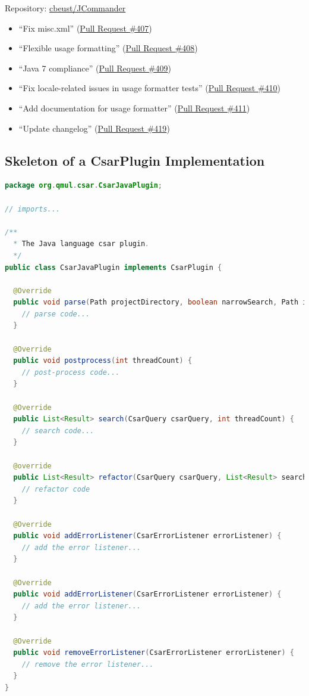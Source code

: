\documentclass[12pt, letterpaper]{article}
\begin{document}
Repository: \href{https://github.com/cbeust/jcommander}{cbeust/JCommander}
\begin{itemize}
  \item ``Fix misc.xml'' (\href{https://github.com/cbeust/jcommander/pull/407}{Pull Request \#407})
  \item ``Flexible usage formatting'' (\href{https://github.com/cbeust/jcommander/pull/408}{Pull Request \#408})
  \item ``Java 7 compliance'' (\href{https://github.com/cbeust/jcommander/pull/409}{Pull Request \#409})
  \item ``Fix locale-related issues in usage formatter tests'' (\href{https://github.com/cbeust/jcommander/pull/410}{Pull Request \#410})
  \item ``Add documentation for usage formatter'' (\href{https://github.com/cbeust/jcommander/pull/411}{Pull Request \#411})
  \item ``Update changelog'' (\href{https://github.com/cbeust/jcommander/pull/419}{Pull Request \#419})
\end{itemize}

\subsection{Skeleton of a CsarPlugin Implementation}
\label{apx:SkeletonCsarPluginImplementation}

\begin{lstlisting}[language=Java]
package org.qmul.csar.CsarJavaPlugin;

// imports...

/**
  * The Java language csar plugin.
  */
public class CsarJavaPlugin implements CsarPlugin {

  @Override
  public void parse(Path projectDirectory, boolean narrowSearch, Path ignoreFile, int threadCount) {
    // parse code...
  }

  @Override
  public void postprocess(int threadCount) {
    // post-process code...
  }

  @Override
  public List<Result> search(CsarQuery csarQuery, int threadCount) {
    // search code...
  }

  @override
  public List<Result> refactor(CsarQuery csarQuery, List<Result> searchResults, int threadCount) {
    // refactor code
  }

  @Override
  public void addErrorListener(CsarErrorListener errorListener) {
    // add the error listener...
  }

  @Override
  public void addErrorListener(CsarErrorListener errorListener) {
    // add the error listener...
  }

  @Override
  public void removeErrorListener(CsarErrorListener errorListener) {
    // remove the error listener...
  }
}
\end{lstlisting}
\end{document}
